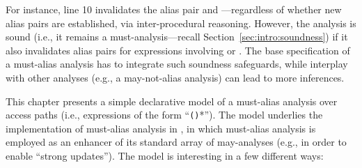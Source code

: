 For instance, line 10 invalidates the alias pair  and ---regardless of whether new alias pairs are established, via inter-procedural reasoning. However, the analysis is sound (i.e., it remains a must-analysis---recall Section~\ref{sec:intro:soundness}) if it also invalidates alias pairs for expressions involving  or . The base specification of a must-alias analysis has to integrate such soundness safeguards, while interplay with other analyses (e.g., a may-not-alias analysis) can lead to more inferences.

This chapter presents a simple declarative model of a must-alias analysis over access paths (i.e., expressions of the form ``\texttt{()}*''). The model underlies the implementation of must-alias analysis in \doop{}, in which must-alias analysis is employed as an enhancer of its standard array of may-analyses (e.g., in order to enable ``strong updates''). The model is interesting in a few different ways:

